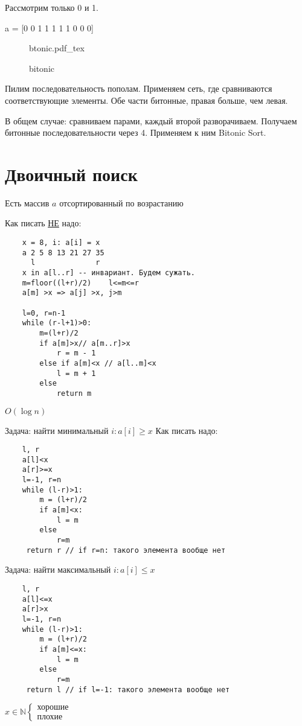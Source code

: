 \documentclass{book}
\newcommand\N{\ensuremath{\mathbb{N}}}
\theoremstyle{definition}
\newcommand{\incfig}[1]{%
    \def\svgwidth{\columnwidth}
    {#1.pdf_tex}
}
\begin{document}
Рассмотрим только 0 и 1. 

a = [0 0 1 1 1 1 1 0 0 0]

\begin{figure}[Ht]
    \centering
    \incfig{btonic}
    \caption{bitonic}
    \label{fig:btonic}
\end{figure}

Пилим последовательность пополам. Применяем сеть, где сравниваются соответствующие элементы. Обе части битонные, правая больше, чем левая.


В общем случае: сравниваем парами, каждый второй разворачиваем. Получаем битонные последовательности через 4. Применяем к ним Bitonic Sort.

\section{Двоичный поиск}

Есть массив $a$ отсортированный по возрастанию

Как писать \underline{НЕ} надо:
 \begin{verbatim}
    x = 8, i: a[i] = x
    a 2 5 8 13 21 27 35
      l              r
    x in a[l..r] -- инвариант. Будем сужать.
    m=floor((l+r)/2)    l<=m<=r
    a[m] >x => a[j] >x, j>m

    l=0, r=n-1
    while (r-l+1)>0:
        m=(l+r)/2
        if a[m]>x// a[m..r]>x
            r = m - 1
        else if a[m]<x // a[l..m]<x
            l = m + 1
        else
            return m
 \end{verbatim}

 $O(\log n)$

 Задача: найти минимальный $i:a[i]\geqslant x$
 Как писать надо:
 \begin{verbatim}
    l, r
    a[l]<x
    a[r]>=x
    l=-1, r=n
    while (l-r)>1:
        m = (l+r)/2
        if a[m]<x:
            l = m
        else
            r=m
     return r // if r=n: такого элемента вообще нет
 \end{verbatim}

 Задача: найти максимальный $i: a[i]\leqslant x$
 \begin{verbatim}
    l, r
    a[l]<=x
    a[r]>x
    l=-1, r=n
    while (l-r)>1:
        m = (l+r)/2
        if a[m]<=x:
            l = m
        else
            r=m
     return l // if l=-1: такого элемента вообще нет
 \end{verbatim}

$x\in \N  \begin{cases}
    \text{хорошие}\\
    \text{плохие}
\end{cases}$
\end{document}
